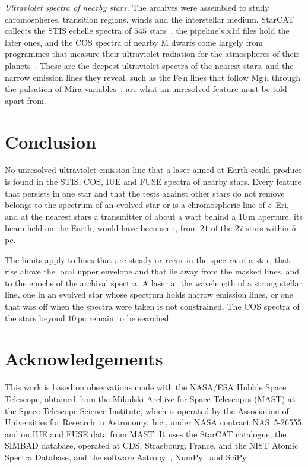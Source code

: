 \documentclass[3p,11pt]{elsarticle}
\newcommand{\ion}[2]{#1\,\textsc{#2}}
\begin{document}
\emph{Ultraviolet spectra of nearby stars.} The archives were assembled to study
chromospheres, transition regions, winds and the interstellar medium. StarCAT collects
the STIS echelle spectra of $545$ stars~\cite{Ayres2010}, the pipeline's x1d files hold
the later ones, and the COS spectra of nearby M
dwarfs come largely from programmes that measure their ultraviolet radiation for the
atmospheres of their planets~\cite{France2016}. These are the deepest ultraviolet spectra
of the nearest stars, and the narrow emission lines they reveal, such as the
\ion{Fe}{ii} lines that follow \ion{Mg}{ii} through the pulsation of Mira
variables~\cite{WoodKarovska2000}, are what an unresolved feature must be told apart
from.

\section{Conclusion}\label{sec:conclusion}

No unresolved ultraviolet emission line that a laser aimed at Earth could produce is
found in the STIS, COS, IUE and FUSE spectra of nearby stars. Every feature that persists
in one star and that the tests against other stars do not remove belongs to the spectrum
of an evolved star or is a chromospheric line of $\epsilon$~Eri, and at the nearest stars
a transmitter of about a watt behind a $10$\,m aperture, its beam held on the Earth,
would have been seen, from $21$ of the $27$ stars within $5$\,pc.

The limits apply to lines that are steady or recur in the spectra of a star, that rise
above the local upper envelope and that lie away from the masked lines, and to the
epochs of the archival spectra. A laser at the wavelength of a strong stellar line, one
in an evolved star whose spectrum holds narrow emission lines, or one that was off when
the spectra were taken is not constrained. The COS spectra of the stars beyond $10$\,pc
remain to be searched.

\section*{Acknowledgements}

This work is based on observations made with the NASA/ESA Hubble Space Telescope,
obtained from the Mikulski Archive for Space Telescopes (MAST) at the Space Telescope
Science Institute, which is operated by the Association of Universities for Research in
Astronomy, Inc., under NASA contract NAS~5-26555, and on IUE and FUSE data from MAST. It
uses the StarCAT catalogue, the SIMBAD database, operated at CDS, Strasbourg, France,
and the NIST Atomic Spectra Database, and the software Astropy~\cite{Astropy2022},
NumPy~\cite{Harris2020} and SciPy~\cite{Virtanen2020}.
\end{document}
